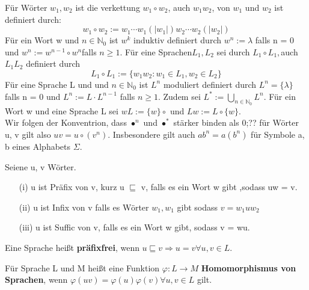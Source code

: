     Für Wörter \(w_{1}, w_{2}\) ist die verkettung  \(w_{1} \circ w_{2}\), auch \(w_{1}w_{2}\), von \(w_{1}\) und \(w_{2}\) ist definiert durch:
    \[
        w_{1} \circ w_{2} := w_{1} \cdots w_{1} (\lvert w_{1} \rvert)w_{2} \cdots w_{2} (\lvert w_{2} \rvert)
    \]
    Für ein Wort w und \(n \in \mathbb{N}_{0}\) ist \(w^{k}\) induktiv definiert durch \(w^{n} := \lambda \) falls n = 0 und \(w^{n} := w^{n-1} \circ w^{n} \)falls \(n \geq  1\). Für eine Sprachen\( L_{1}, L_{2}\) sei durch \(L_{1} \circ L_{1}, \)auch \(L_{1}L_{2}\) definiert durch
    \[
        L_{1} \circ L_{1} := \{w_{1}w_{2} : w_{1} \in L_{1}, w_{2} \in L_{2}\}
    \]
    Für eine Sprache L und und \(n \in\mathbb{N}_{0}\) ist \(L^{n}\) moduliert definiert durch \(L^{n} = \{\lambda\} \)falls n = 0 und \(L^{n} := L \cdot L^{n - 1}\) falls \(n \geq 1\). Zudem sei \(L^{*} := \bigcup \limits_{n \in \mathbb{N}_{0}}L^{n}\). Für ein Wort w und eine Sprache L sei \(wL :=\{w\}\circ\) und \(Lw := L\circ \{w\}\).\\Wir folgen der Konventrion, dass \(\bullet^{n}\) und \(\bullet^{*}\) stärker binden als 0;?? für Wörter u, v gilt also \(uv = u \circ (v^{n})\). Insbesondere gilt auch \(ab^{n} = a(b^{n})\) für Symbole a, b eines Alphabets \(\Sigma\).

    Seiene u, v Wörter.
    \begin{itemize}
        \item [(i)] u ist Präfix von v, kurz u \(\sqsubseteq\) v, falls es ein Wort w gibt ,sodass uw = v.
        \item [(ii)] u ist Infix von v falls es Wörter \(w_{1}, w_{1}\) gibt sodass \(v = w_{1} u w_{2}\)
        \item [(iii)] u ist Suffic von v, falls es ein Wort w gibt, sodass v = wu.
    \end{itemize}

    Eine Sprache heißt \textbf{präfixfrei}, wenn \(u\sqsubseteq v \Rightarrow u = v \forall u,v \in L\).

    Für Sprache L und M heißt eine Funktion \(\varphi : L \rightarrow M\) \textbf{Homomorphismus von Sprachen}, wenn \(\varphi(uv) = \varphi (u) \varphi (v) \forall u, v \in L\) gilt.

